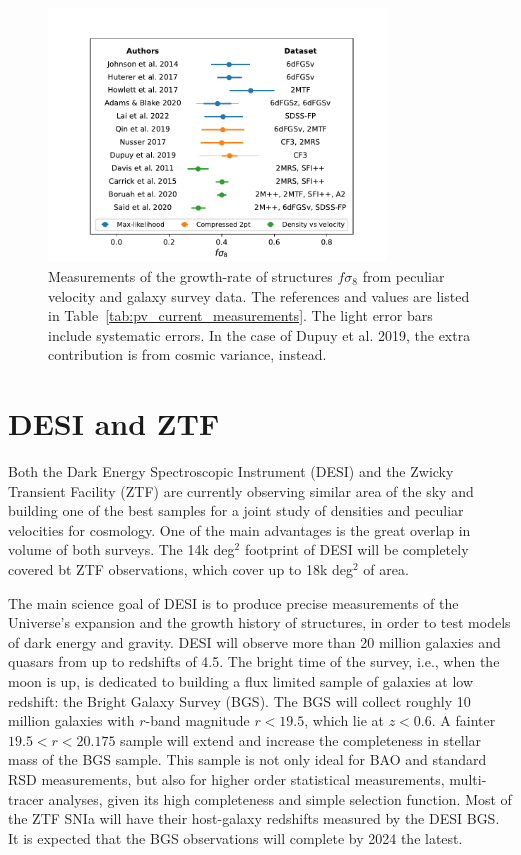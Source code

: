 \begin{figure}
    \centering 
    \includegraphics[width=0.8\textwidth]{fig/velocities/plot_fs8_pv.pdf}
    \caption{Measurements of the growth-rate of structures $f\sigma_8$ from peculiar velocity 
    and galaxy survey data. The references and values are listed in Table~\ref{tab:pv_current_measurements}.
    The light error bars include systematic errors. In the case of Dupuy et al. 2019, the extra contribution 
    is from cosmic variance, instead. }
    \label{fig:pv_current_measurements}
\end{figure}

\section{DESI and ZTF}
\label{velocities:desi_ztf}

Both the Dark Energy Spectroscopic Instrument (DESI) and the Zwicky Transient Facility (ZTF)
are currently observing similar area of the sky and building one of the best samples for a joint study of 
densities and peculiar velocities for cosmology. 
One of the main advantages is the great overlap in volume of both surveys. The 14k deg$^2$ footprint 
of DESI will be completely covered bt ZTF observations, which cover up to 18k deg$^2$ of area. 

The main science goal of DESI is to produce precise measurements of the Universe's expansion and 
the growth history of structures, in order to test models of dark energy and gravity. 
DESI will observe more than 20 million galaxies and quasars from up to redshifts of 4.5. 
The bright time of the survey, i.e., when the moon is up, is dedicated to building a flux limited sample of
galaxies at low redshift: the Bright Galaxy Survey (BGS). The BGS will collect roughly 10 million galaxies 
with $r$-band magnitude $r < 19.5$, which lie at $z < 0.6$. 
A fainter  $19.5<r<20.175$ sample will extend and increase the completeness in stellar mass of the BGS sample. 
This sample is not only ideal for BAO and standard RSD measurements, but also for higher order statistical 
measurements, multi-tracer analyses, given its high completeness and simple selection function. 
Most of the ZTF SNIa will have their host-galaxy redshifts measured by the DESI BGS.
It is expected that the BGS observations will complete by 2024 the latest. 

